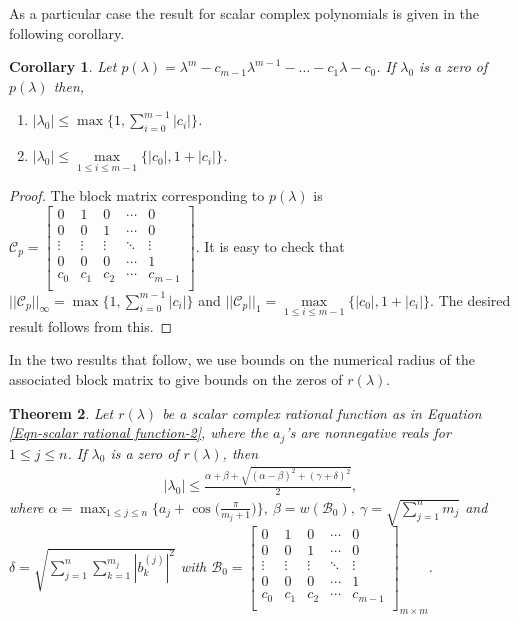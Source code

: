\documentclass[12pt, reqno]{amsart}
\newtheorem{theorem}{Theorem}[section]
\newtheorem{corollary}[theorem]{Corollary}
\theoremstyle{definition}
\theoremstyle{remark}
\numberwithin{equation}{section}
\begin{document}
\medskip
\noindent
As a particular case the result for scalar 
complex polynomials is given in the following corollary.
\begin{corollary}\label{Cor-bounds for zeros using norms}
Let $p(\lambda) = \lambda^m -c_{m-1}\lambda^{m-1} - \dots -c_1 \lambda -c_0$. If 
$\lambda_0$ is a zero of $p(\lambda)$ then,
\begin{enumerate}
\item $|\lambda_0| \leq \max \Big\{1, \displaystyle \sum_{i=0}^{m-1}|c_i| \Big\}$.
\item $|\lambda_0| \leq \max\limits_{1 \leq i \leq m-1} \{|c_0|, 1+|c_i| \}$.
\end{enumerate} 
\end{corollary}
\begin{proof}
The block matrix corresponding to $p(\lambda)$ is $\mathcal{C}_p = \begin{bmatrix}
0 & 1 & 0 & \cdots & 0\\
0 & 0 & 1 & \cdots & 0\\
\vdots & \vdots & \vdots & \ddots & \vdots\\
0 & 0 & 0 & \cdots & 1\\
c_0 & c_1 & c_2 & \cdots & c_{m-1}\\
\end{bmatrix}$. It is easy to check that $||\mathcal{C}_p||_\infty = \max 
\Big\{1, \displaystyle \sum_{i=0}^{m-1}|c_i| \Big\}$ and $||\mathcal{C}_p||_1 = 
\max\limits_{1 \leq i \leq m-1} \{|c_0|, 1+|c_i| \}$. The desired result follows 
from this. 
\end{proof}

In the two results that follow, we use bounds on the numerical radius of the
associated block matrix to give bounds on the zeros of $r(\lambda)$.

\begin{theorem}\label{Thm-bounds on zeros using numerical range-2}
Let $r(\lambda)$ be a scalar complex rational function as in Equation 
\eqref{Eqn-scalar rational function-2}, where the $a_j$'s are nonnegative reals 
for $1 \leq j \leq n$. If $\lambda_0$ is a zero of $r(\lambda)$, then 
\begin{align*}
|\lambda_0| \leq \displaystyle \frac{\alpha+ \beta +\sqrt{(\alpha-\beta)^2 + 
(\gamma+\delta)^2}}{2},
\end{align*}
where $\alpha = \displaystyle \max_{1 \leq j \leq n} \Big\{a_j + 
\cos\Big(\frac{\pi}{m_j+1}\Big) \Big\}, \ \beta = w(\mathcal{B}_0), \ \gamma = 
\displaystyle \sqrt{\sum_{j=1}^{n} m_j}$ and \\ 
$\delta = \displaystyle 
\sqrt{ \sum_{j=1}^{n}\sum_{k=1}^{m_j} {|b_{k}^{(j)}|}^2}$ with $\mathcal{B}_0 = 
\begin{bmatrix}
0 & 1 & 0 & \cdots & 0\\
0 & 0 & 1 & \cdots & 0\\
\vdots & \vdots & \vdots & \ddots & \vdots\\
0 & 0 & 0 & \cdots & 1\\
c_0 & c_1 & c_2 & \cdots & c_{m-1}\\ 
\end{bmatrix}_{m \times m}$.
\end{theorem}
\end{document}
